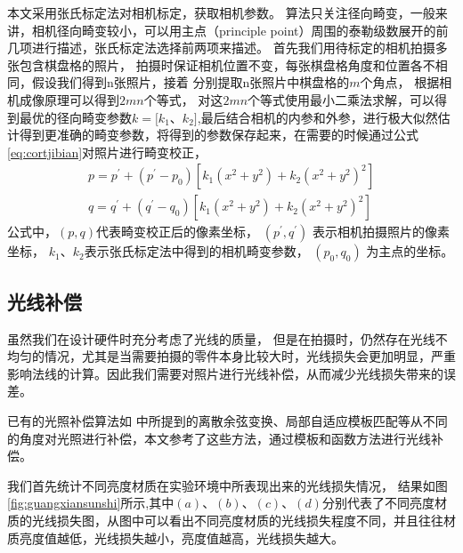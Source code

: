 本文采用张氏标定法\cite{zhang2000flexible}对相机标定，获取相机参数。
算法只关注径向畸变，一般来讲，相机径向畸变较小，可以用主点（principle point）周围的泰勒级数展开的前几项进行描述，张氏标定法选择前两项来描述。
首先我们用待标定的相机拍摄多张包含棋盘格的照片，
拍摄时保证相机位置不变，每张棋盘格角度和位置各不相同，假设我们得到n张照片，接着
分别提取n张照片中棋盘格的$m$个角点，
根据相机成像原理可以得到$2mn$个等式，
对这$2mn$个等式使用最小二乘法求解，可以得到最优的径向畸变参数$k=[k_{1}$、$k_{2}]$,最后结合相机的内参和外参，进行极大似然估计得到更准确的畸变参数，将得到的参数保存起来，在需要的时候通过公式\eqref{eq:cortjibian}对照片进行畸变校正，
\begin{equation}\label{eq:cortjibian}
\begin{split}
p=p^{'}+(p^{'}-p_{0} )[k_{1} (x^{2}+y^{2} )+k_{2} (x^{2}+y^{2} )^{2} ]\\
q=q^{'}+(q^{'}-q_{0} )[k_{1} (x^{2}+y^{2} )+k_{2} (x^{2}+y^{2} )^{2} ]
\end{split}
\end{equation}
公式中，$(p,q)$代表畸变校正后的像素坐标，
$(p^{'}, q^{'})$
表示相机拍摄照片的像素坐标，
$k_{1}$、$k_{2}$表示张氏标定法中得到的相机畸变参数，
$(p_{0},q_{0})$
为主点的坐标。

\subsection{光线补偿}

虽然我们在设计硬件时充分考虑了光线的质量，
但是在拍摄时，仍然存在光线不均匀的情况，尤其是当需要拍摄的零件本身比较大时，光线损失会更加明显，严重影响法线的计算。因此我们需要对照片进行光线补偿，从而减少光线损失带来的误差。

已有的光照补偿算法如
\cite{贾灵芝2008基于自适应光线补偿的人脸检测算法,chen2006illumination,ruiz2008illumination,malassiotis2005robust,zheng2008intra,wiegand2003overview,tan2006intra,tan2007intra}中所提到的离散余弦变换、局部自适应模板匹配等从不同的角度对光照进行补偿，本文参考了这些方法，通过模板和函数方法进行光线补偿。

我们首先统计不同亮度材质在实验环境中所表现出来的光线损失情况，
结果如图\ref{fig:guangxiansunshi}所示,其中$(a)$、$(b)$、$(c)$、$(d)$分别代表了不同亮度材质的光线损失图，从图中可以看出不同亮度材质的光线损失程度不同，并且往往材质亮度值越低，光线损失越小，亮度值越高，光线损失越大。


